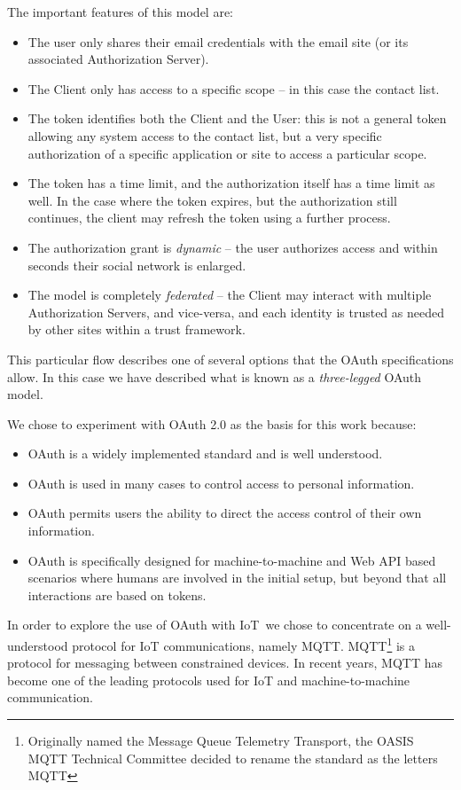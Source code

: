 \documentclass{IEEEtran}
\begin{document}
The important features of this model are:
\begin{itemize}
\item The user only shares their email credentials with the email site (or its associated Authorization Server).
\item The Client only has access to a specific scope -- in this case the contact list.
\item The token identifies both the Client and the User: this is not a general token allowing 
any system access to the contact list, but a very specific authorization of a specific application or site to
access a particular scope.
\item The token has a time limit, and the authorization itself has a time limit as well. In the case 
where the token expires, but the authorization still continues, the client may refresh the token using a further
process.
\item The authorization grant is \emph{dynamic} -- the user authorizes access and within seconds 
their social network is enlarged. 
\item The model is completely \emph{federated} -- the Client may interact with multiple Authorization
Servers, and vice-versa, and each identity is trusted as needed by other sites within a 
trust framework.
\end{itemize}

This particular flow describes one of several options that the OAuth specifications allow. In this 
case we have described what is known as a \emph{three-legged} OAuth model. 

We chose to experiment with OAuth 2.0 as the basis for this work because:
\begin{itemize}
\item OAuth is a widely implemented standard and is well understood.
\item OAuth is used in many cases to control access to personal information.
\item OAuth permits users the ability to direct the access control of their own information.
\item OAuth is specifically designed for machine-to-machine and Web API based scenarios where humans 
are involved in the initial setup, but beyond that all interactions are based on tokens.
\end{itemize}

In order to explore the use of OAuth with IoT\, we chose to concentrate on a well-understood protocol for IoT
communications, namely MQTT. MQTT\footnote{Originally named the Message Queue Telemetry Transport,
the OASIS MQTT Technical Committee decided to rename the standard as the 
letters MQTT}\cite{locke2010mq} is a protocol for messaging between constrained devices. 
In recent years, MQTT has become one of the leading protocols used for IoT and machine-to-machine communication.
\end{document}
